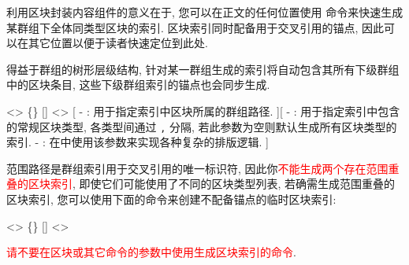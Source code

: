 
利用区块封装内容组件的意义在于, 您可以在正文的任何位置使用  命令来快速生成某群组下全体同类型区块的索引. 区块索引同时配备用于交叉引用的锚点, 因此可以在其它位置以便于读者快速定位到此处.

得益于群组的树形层级结构, 针对某一群组生成的索引将自动包含其所有下级群组中的区块条目, 这些下级群组索引的锚点也会同步生成.

<>{
    \{\}
    []
    <>
}[
    -  : 用于指定索引中区块所属的群组路径.
][
    -  : 用于指定索引中包含的常规区块类型, 各类型间通过 \texttt{,} 分隔, 若此参数为空则默认生成所有区块类型的索引.
    -  : 在中使用该参数来实现各种复杂的排版逻辑.
]

范围路径是群组索引用于交叉引用的唯一标识符, 因此你\textcolor{red}{不能生成两个存在范围重叠的区块索引}, 即使它们可能使用了不同的区块类型列表, 若确需生成范围重叠的区块索引, 您可以使用下面的命令来创建不配备锚点的临时区块索引:

<>{
    \{\}
    []
    <>
}

\textcolor{red}{请不要在区块或其它命令的参数中使用生成区块索引的命令}.

\newpage
